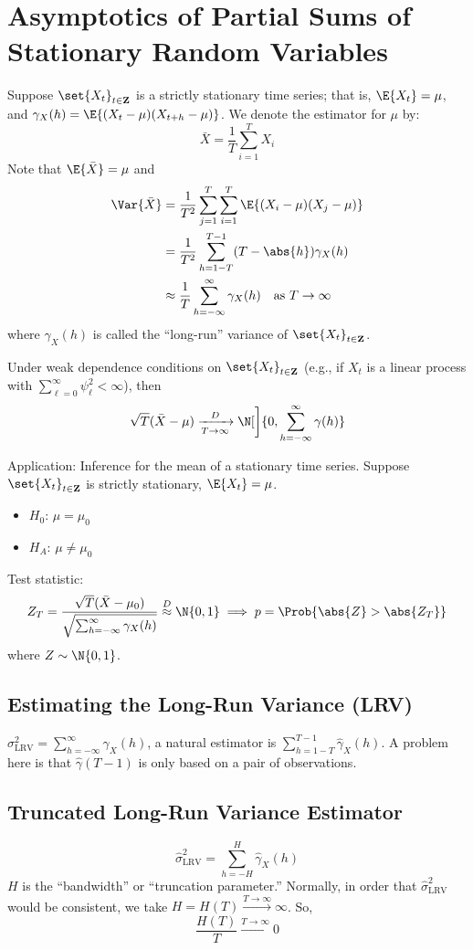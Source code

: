 \section{Asymptotics of Partial Sums of Stationary Random Variables}
Suppose $ \set{X_t}_{t\in\mathbf{Z}} $ is a strictly stationary
time series; that is, $ \E{X_t}=\mu $, and $ \gamma_X(h)=\E{(X_t-\mu)(X_{t+h}-\mu)} $.
We denote the estimator for $ \mu $ by:
\[ \bar{X}=\frac{1}{T} \sum_{i=1}^{T} X_i \]
Note that $ \E{\bar{X}}=\mu $ and
\begin{align*}
    \Var{\bar{X}}
     & =\frac{1}{T^2} \sum_{j=1}^{T} \sum_{i=1}^{T} \E{(X_i-\mu)(X_j-\mu)}                \\
     & =\frac{1}{T^2} \sum_{h=1-T}^{T-1} (T-\abs{h})\gamma_X(h)                           \\
     & \approx \frac{1}{T} \sum_{h=-\infty}^{\infty} \gamma_X(h)\quad\text{as }T\to\infty
\end{align*}
where $ \gamma_X(h) $ is called the ``long-run'' variance of $ \set{X_t}_{t\in\mathbf{Z}} $.
\begin{Theorem}{}{}
    Under weak dependence conditions on $ \set{X_t}_{t\in\mathbf{Z}} $
    (e.g., if $ X_t $ is a linear process with $ \sum_{\ell=0}^{\infty}\psi_\ell^2<\infty $),
    then
    \[ \sqrt{T}(\bar{X}-\mu)\xrightarrow[T\to\infty]{D}\N[\bigg]{0,\sum_{h=-\infty}^{\infty} \gamma(h)} \]
\end{Theorem}
Application: Inference for the mean of a stationary time series.
Suppose $ \set{X_t}_{t\in\mathbf{Z}} $ is strictly stationary, $ \E{X_t}=\mu $.
\begin{itemize}
    \item $ H_0 $: $ \mu=\mu_0 $
    \item $ H_A $: $ \mu\ne \mu_0 $
\end{itemize}
Test statistic:
\[ Z_T=\frac{\sqrt{T}(\bar{X}-\mu_0)}{\sqrt{\sum_{h=-\infty}^{\infty} \gamma_X(h)}}\stackrel{D}{\approx}\N{0,1}
    \implies p=\Prob{\abs{Z}>\abs{Z_T}} \]
where $ Z \sim \N{0,1} $.
\subsection*{Estimating the Long-Run Variance (LRV)}
$ \sigma_{\text{LRV}}^2=
    \sum_{h=-\infty}^{\infty} \gamma_X(h) $, a natural estimator is
$ \sum_{h=1-T}^{T-1} \hat{\gamma}_X(h) $. A problem here is that $ \hat{\gamma}(T-1) $
is only based on a pair of observations.
\subsection*{Truncated Long-Run Variance Estimator}
\[ \hat{\sigma}_{\text{LRV}}^2=\sum_{h=-H}^{H} \hat{\gamma}_X(h) \]
$ H $ is the ``bandwidth'' or ``truncation parameter.'' Normally,
in order that $ \hat{\sigma}_{\text{LRV}}^2 $ would be consistent, we take
$ H=H(T)\xrightarrow{T\to\infty}\infty $. So,
\[ \frac{H(T)}{T} \xrightarrow{T\to\infty}0 \]
